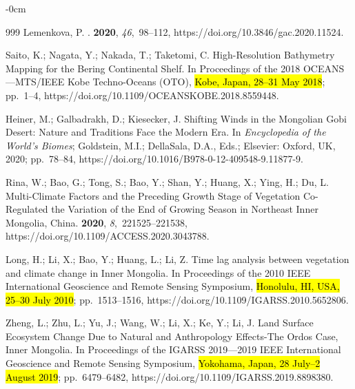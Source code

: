 \documentclass[geosciences,article,accept,pdftex,oneauthor]{Definitions/mdpi}
\begin{document}
\begin{adjustwidth}{-\extralength}{0cm}
\begin{thebibliography}{999}
Lemenkova, P.
.
 {\bf 2020}, {\em 46},~98--112, https://doi.org/10.3846/gac.2020.11524.

Saito, K.; Nagata, Y.; Nakada, T.; Taketomi, C.
\newblock High-Resolution Bathymetry Mapping for the Bering Continental Shelf.
\newblock In Proceedings of the 2018 OCEANS---MTS/IEEE Kobe Techno-Oceans
  (OTO), \hl{Kobe, Japan,  28--31 May 2018}; pp.~1--4, https://doi.org/10.1109/OCEANSKOBE.2018.8559448.

Heiner, M.; Galbadrakh, D.; Kiesecker, J.
\newblock Shifting Winds in the Mongolian Gobi Desert: Nature and Traditions
  Face the Modern Era. In {\em Encyclopedia of the World's Biomes}; Goldstein,
  M.I.; DellaSala, D.A., Eds.; Elsevier: Oxford, UK, 2020; pp.~78--84, https://doi.org/10.1016/B978-0-12-409548-9.11877-9.

Rina, W.; Bao, G.; Tong, S.; Bao, Y.; Shan, Y.; Huang, X.; Ying, H.; Du, L.
\newblock Multi-Climate Factors and the Preceding Growth Stage of Vegetation
  Co-Regulated the Variation of the End of Growing Season in Northeast Inner
  Mongolia, China.
 {\bf 2020}, {\em 8},~221525--221538, https://doi.org/10.1109/ACCESS.2020.3043788.

Long, H.; Li, X.; Bao, Y.; Huang, L.; Li, Z.
\newblock Time lag analysis between vegetation and climate change in Inner
  Mongolia.
\newblock In Proceedings of the 2010 IEEE International Geoscience and Remote
  Sensing Symposium, \hl{Honolulu, HI, USA,  25--30 July 2010}; pp.~1513--1516, https://doi.org/10.1109/IGARSS.2010.5652806.

Zheng, L.; Zhu, L.; Yu, J.; Wang, W.; Li, X.; Ke, Y.; Li, J.
\newblock Land Surface Ecosystem Change Due to Natural and Anthropology
  Effects-The Ordos Case, Inner Mongolia.
\newblock In Proceedings of the IGARSS 2019---2019 IEEE International
  Geoscience and Remote Sensing Symposium,  \hl{Yokohama, Japan, 28 July--2 August  2019}; pp.~6479--6482, https://doi.org/10.1109/IGARSS.2019.8898380.


\end{thebibliography}
\end{adjustwidth}
\end{document}
